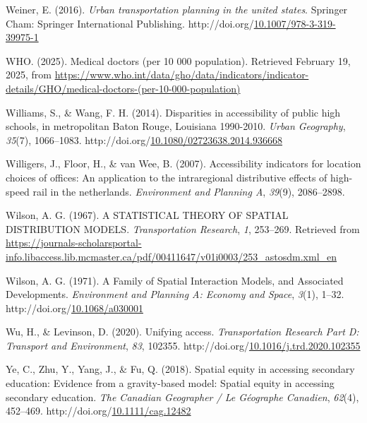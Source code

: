 \documentclass[
11pt, %
oneside, %
english, %
singlespacing, %
]{macthesis} %
\newlength{\cslhangindent}
\newenvironment{CSLReferences}[2] %
{\begin{list}{}{%
	\setlength{\itemindent}{0pt}
	\setlength{\leftmargin}{0pt}
	\setlength{\parsep}{0pt}
	\ifodd #1
	\setlength{\leftmargin}{\cslhangindent}
	\setlength{\itemindent}{-1\cslhangindent}
	\fi
	\setlength{\itemsep}{#2\baselineskip}}}
{\end{list}}
\begin{document}
\begin{CSLReferences}{1}{0}
Weiner, E. (2016). \emph{Urban transportation planning in the united states}. Springer Cham: Springer International Publishing. http://doi.org/\href{https://doi.org/10.1007/978-3-319-39975-1}{10.1007/978-3-319-39975-1}

WHO. (2025). Medical doctors (per 10 000 population). Retrieved February 19, 2025, from \url{https://www.who.int/data/gho/data/indicators/indicator-details/GHO/medical-doctors-(per-10-000-population)}

Williams, S., \& Wang, F. H. (2014). Disparities in accessibility of public high schools, in metropolitan {Baton} {Rouge}, {Louisiana} 1990-2010. \emph{Urban Geography}, \emph{35}(7), 1066--1083. http://doi.org/\href{https://doi.org/10.1080/02723638.2014.936668}{10.1080/02723638.2014.936668}

Willigers, J., Floor, H., \& van Wee, B. (2007). Accessibility indicators for location choices of offices: An application to the intraregional distributive effects of high-speed rail in the netherlands. \emph{Environment and Planning A}, \emph{39}(9), 2086--2898.

Wilson, A. G. (1967). A {STATISTICAL} {THEORY} {OF} {SPATIAL} {DISTRIBUTION} {MODELS}. \emph{Transportation Research}, \emph{1}, 253--269. Retrieved from \url{https://journals-scholarsportal-info.libaccess.lib.mcmaster.ca/pdf/00411647/v01i0003/253_astosdm.xml_en}

Wilson, A. G. (1971). A Family of Spatial Interaction Models, and Associated Developments. \emph{Environment and Planning A: Economy and Space}, \emph{3}(1), 1--32. http://doi.org/\href{https://doi.org/10.1068/a030001}{10.1068/a030001}

Wu, H., \& Levinson, D. (2020). Unifying access. \emph{Transportation Research Part D: Transport and Environment}, \emph{83}, 102355. http://doi.org/\href{https://doi.org/10.1016/j.trd.2020.102355}{10.1016/j.trd.2020.102355}

Ye, C., Zhu, Y., Yang, J., \& Fu, Q. (2018). Spatial equity in accessing secondary education: {Evidence} from a gravity-based model: {Spatial} equity in accessing secondary education. \emph{The Canadian Geographer / Le Géographe Canadien}, \emph{62}(4), 452--469. http://doi.org/\href{https://doi.org/10.1111/cag.12482}{10.1111/cag.12482}


\end{CSLReferences}
\end{document}
